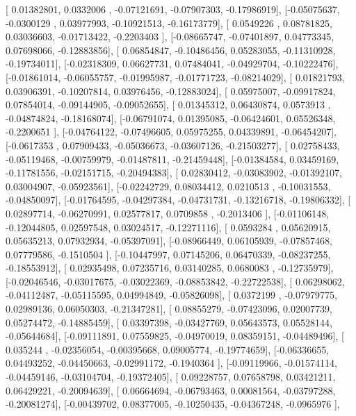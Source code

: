 \documentclass{article}
\begin{document}
       [ 0.01382801,  0.0332006 , -0.07121691, -0.07907303, -0.17986919],
       [-0.05075637, -0.0300129 ,  0.03977993, -0.10921513, -0.16173779],
       [ 0.0549226 ,  0.08781825,  0.03036603, -0.01713422, -0.2203403 ],
       [-0.08665747, -0.07401897,  0.04773345,  0.07698066, -0.12883856],
       [ 0.06854847, -0.10486456,  0.05283055, -0.11310928, -0.19734011],
       [-0.02318309,  0.06627731,  0.07484041, -0.04929704, -0.10222476],
       [-0.01861014, -0.06055757, -0.01995987, -0.01771723, -0.08214029],
       [ 0.01821793,  0.03906391, -0.10207814,  0.03976456, -0.12883024],
       [ 0.05975007, -0.09917824,  0.07854014, -0.09144905, -0.09052655],
       [ 0.01345312,  0.06430874,  0.0573913 , -0.04874824, -0.18168074],
       [-0.06791074,  0.01395085, -0.06424601,  0.05526348, -0.2200651 ],
       [-0.04764122, -0.07496605,  0.05975255,  0.04339891, -0.06454207],
       [-0.0617353 ,  0.07909433, -0.05036673, -0.03607126, -0.21503277],
       [ 0.02758433, -0.05119468, -0.00759979, -0.01487811, -0.21459448],
       [-0.01384584,  0.03459169, -0.11781556, -0.02151715, -0.20494383],
       [ 0.02830412, -0.03083902, -0.01392107,  0.03004907, -0.05923561],
       [-0.02242729,  0.08034412,  0.0210513 , -0.10031553, -0.04850097],
       [-0.01764595, -0.04297384, -0.04731731, -0.13216718, -0.19806332],
       [ 0.02897714, -0.06270991,  0.02577817,  0.0709858 , -0.2013406 ],
       [-0.01106148, -0.12044805,  0.02597548,  0.03024517, -0.12271116],
       [ 0.0593284 ,  0.05620915,  0.05635213,  0.07932934, -0.05397091],
       [-0.08966449,  0.06105939, -0.07857468,  0.07779586, -0.1510504 ],
       [-0.10447997,  0.07145206,  0.06470339, -0.08237255, -0.18553912],
       [ 0.02935498,  0.07235716,  0.03140285,  0.0680083 , -0.12735979],
       [-0.02046546, -0.03017675, -0.03022369, -0.08853842, -0.22722538],
       [ 0.06298062, -0.04112487, -0.05115595,  0.04994849, -0.05826098],
       [ 0.0372199 , -0.07979775,  0.02989136,  0.06050303, -0.21347281],
       [ 0.08855279, -0.07423096,  0.02007739,  0.05274472, -0.14885459],
       [ 0.03397398, -0.03427769,  0.05643573,  0.05528144, -0.05644684],
       [-0.09111891,  0.07559825, -0.04970019,  0.08359151, -0.04489496],
       [ 0.035244  , -0.02356054, -0.00395668,  0.09005774, -0.19774659],
       [-0.06336655,  0.04493252, -0.04450663, -0.02991172, -0.1940364 ],
       [-0.09119966, -0.01574114, -0.04459146, -0.03104704, -0.19372405],
       [ 0.09228757,  0.07658798,  0.03421211,  0.06429221, -0.20094639],
       [ 0.06664694, -0.06793463,  0.00081564, -0.03797288, -0.20081274],
       [-0.00439702,  0.08377005, -0.10250435, -0.04367248, -0.0965976 ],
\end{document}
